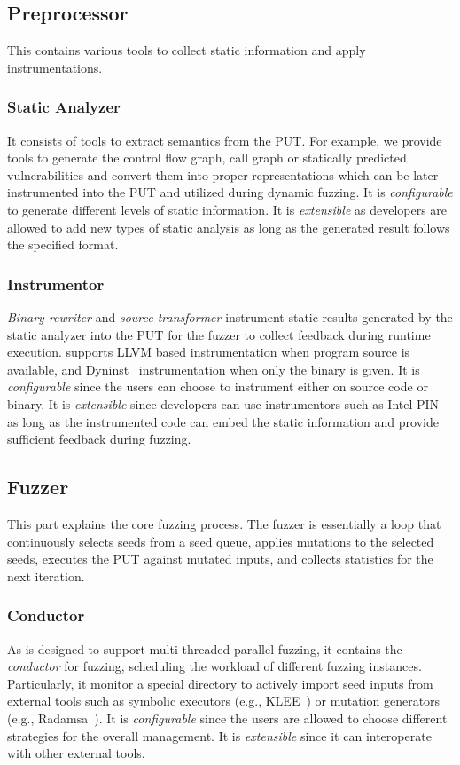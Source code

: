 \subsection{Preprocessor}
This contains various tools to collect static information and apply instrumentations.


\subsubsection{Static Analyzer}\label{sec:static_analysis}
It consists of tools to extract semantics from the PUT.
For example, we provide tools to generate the control flow graph, call graph or statically predicted vulnerabilities and convert them into proper representations which can be later instrumented into the PUT and utilized during dynamic fuzzing.
It is \textit{configurable} to generate different levels of static information. It is \textit{extensible} as developers are allowed to add new types of static analysis as long as the generated result follows the specified format.


\subsubsection{Instrumentor}
\emph{Binary rewriter} and \emph{source transformer} instrument static results generated by the static analyzer into the PUT for the fuzzer to collect feedback during runtime execution.
{\FOT} supports LLVM based instrumentation when program source is available, and Dyninst~\cite{dyninst} instrumentation when only the binary is given.
It is \textit{configurable} since the users can choose to instrument either on source code or binary.
It is \textit{extensible} since developers can use instrumentors such as Intel PIN~\cite{pin} as long as the instrumented code can embed the static information and provide sufficient feedback during fuzzing.

\subsection{Fuzzer}
This part explains the core fuzzing process. 
The fuzzer is essentially a loop that continuously selects seeds from a seed queue, applies mutations to the selected seeds, executes the PUT against mutated inputs, and collects statistics for the next iteration.

\subsubsection{Conductor}
As {\FOT} is designed to support multi-threaded parallel fuzzing, it contains the \emph{conductor} for fuzzing, scheduling the workload of different fuzzing instances.
Particularly, it monitor a special directory to actively import seed inputs from external tools such as symbolic executors (e.g., KLEE~\cite{klee}) or mutation generators (e.g., Radamsa~\cite{radamsa}).
It is \textit{configurable} since the users are allowed to choose different strategies for the overall management.
It is \textit{extensible} since it can interoperate with other external tools.



